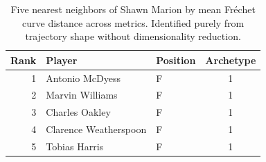 \begin{table}[htbp]
  \centering\small
  \begin{tabular}{rllc}
    \toprule
    Rank & Player & Position & Archetype \\
    \midrule
    1 & Antonio McDyess & F & 1 \\
    2 & Marvin Williams & F & 1 \\
    3 & Charles Oakley & F & 1 \\
    4 & Clarence Weatherspoon & F & 1 \\
    5 & Tobias Harris & F & 1 \\
    \bottomrule
  \end{tabular}
  \caption{Five nearest neighbors of Shawn Marion by mean Fr\'{e}chet curve distance across metrics. Identified purely from trajectory shape without dimensionality reduction.}
  \label{tab:Shawn_Marion_frechet_curve_neighbors}
\end{table}


